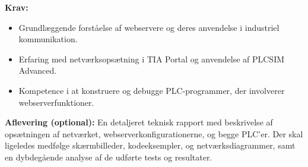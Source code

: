 \textbf{Krav:}
\begin{itemize}
	\item Grundlæggende forståelse af webservere og deres anvendelse i industriel kommunikation.
	\item Erfaring med netværksopsætning i TIA Portal og anvendelse af PLCSIM Advanced.
	\item Kompetence i at konstruere og debugge PLC-programmer, der involverer webserverfunktioner.
\end{itemize}

\noindent\textbf{Aflevering (optional):} En detaljeret teknisk rapport med beskrivelse af opsætningen af netværket, webserverkonfigurationerne, og begge PLC'er. Der skal ligeledes medfølge skærmbilleder, kodeeksempler, og netværksdiagrammer, samt en dybdegående analyse af de udførte tests og resultater.


